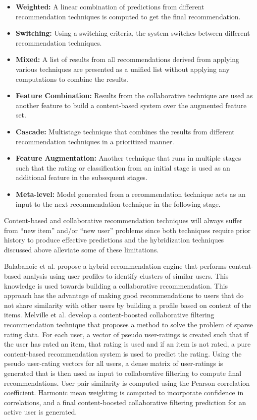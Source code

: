 \documentclass[12pt]{article}
\begin{document}
\begin{itemize}
\item \textbf{Weighted:} A linear combination of predictions from different recommendation techniques is computed to get the final recommendation.
\item \textbf{Switching:} Using a switching criteria, the system switches between different recommendation techniques.
\item \textbf{Mixed:} A list of results from all recommendations derived from applying various techniques are presented as a unified list without applying any computations to combine the results.
\item \textbf{Feature Combination:} Results from the collaborative technique are used as another feature to build a content-based system over the augmented feature set.
\item \textbf{Cascade:} Multistage technique that combines the results from different recommendation techniques in a prioritized manner. 
\item \textbf{Feature Augmentation:} Another technique that runs in multiple stages such that the rating or classification from an initial stage is used as an additional feature in the subsequent stages.
\item \textbf{Meta-level:} Model generated from a recommendation technique acts as an input to the next recommendation technique in the following stage.
\end{itemize}

Content-based and collaborative recommendation techniques will always suffer from ``new item'' and/or ``new user'' problems since both techniques require prior history to produce effective predictions and the hybridization techniques discussed above alleviate some of these limitations. 

Balabanoic et al. \cite{balabanovic} propose a hybrid recommendation engine that performs content-based analysis using user profiles to identify clusters of similar users. This knowledge is used towards building a collaborative recommendation. This approach has the advantage of making good recommendations to users that do not share similarity with other users by building a profile based on content of the items. Melville et al. \cite{melville} develop a content-boosted collaborative filtering recommendation technique that proposes a method to solve the problem of sparse rating data. For each user, a vector of pseudo user-ratings is created such that if the user has rated an item, that rating is used and if an item is not rated, a pure content-based recommendation system is used to predict the rating. Using the pseudo user-rating vectors for all users, a dense matrix of user-ratings is generated that is then used as input to collaborative filtering to compute final recommendations. User pair similarity is computed using the Pearson correlation coefficient. Harmonic mean weighting is computed to incorporate confidence in correlations, and a final content-boosted collaborative filtering prediction for an active user is generated. 
\end{document}
